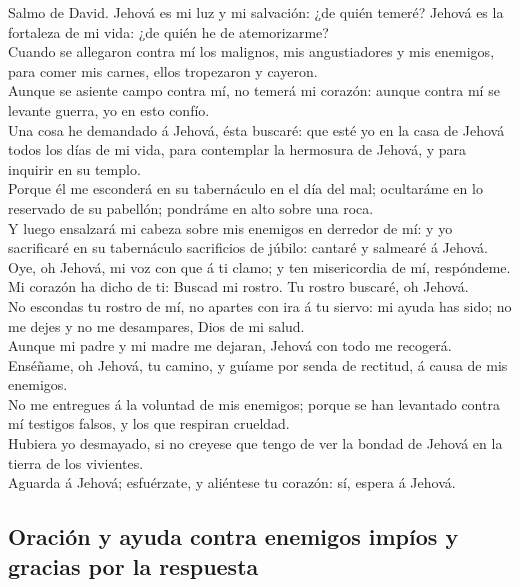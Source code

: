  Salmo de David. Jehová es mi luz y mi salvación: ¿de
quién temeré? Jehová es la fortaleza de mi vida: ¿de quién he de
atemorizarme?\\
 Cuando se allegaron contra mí los malignos, mis
angustiadores y mis enemigos, para comer mis carnes, ellos tropezaron y
cayeron.\\
 Aunque se asiente campo contra mí, no temerá mi corazón:
aunque contra mí se levante guerra, yo en esto confío.\\
 Una cosa he demandado á Jehová, ésta buscaré: que esté yo
en la casa de Jehová todos los días de mi vida, para contemplar la
hermosura de Jehová, y para inquirir en su templo.\\
 Porque él me esconderá en su tabernáculo en el día del
mal; ocultaráme en lo reservado de su pabellón; pondráme en alto sobre
una roca.\\
 Y luego ensalzará mi cabeza sobre mis enemigos en
derredor de mí: y yo sacrificaré en su tabernáculo sacrificios de
júbilo: cantaré y salmearé á Jehová.\\
 Oye, oh Jehová, mi voz con que á ti clamo; y ten
misericordia de mí, respóndeme.\\
 Mi corazón ha dicho de ti: Buscad mi rostro. Tu rostro
buscaré, oh Jehová.\\
 No escondas tu rostro de mí, no apartes con ira á tu
siervo: mi ayuda has sido; no me dejes y no me desampares, Dios de mi
salud.\\
 Aunque mi padre y mi madre me dejaran, Jehová con todo
me recogerá.\\
 Enséñame, oh Jehová, tu camino, y guíame por senda de
rectitud, á causa de mis enemigos.\\
 No me entregues á la voluntad de mis enemigos; porque se
han levantado contra mí testigos falsos, y los que respiran crueldad.\\
 Hubiera yo desmayado, si no creyese que tengo de ver la
bondad de Jehová en la tierra de los vivientes.\\
 Aguarda á Jehová; esfuérzate, y aliéntese tu corazón:
sí, espera á Jehová.

\hypertarget{oraciuxf3n-y-ayuda-contra-enemigos-impuxedos-y-gracias-por-la-respuesta}{%
\subsection{Oración y ayuda contra enemigos impíos y gracias por la
respuesta}\label{oraciuxf3n-y-ayuda-contra-enemigos-impuxedos-y-gracias-por-la-respuesta}}

